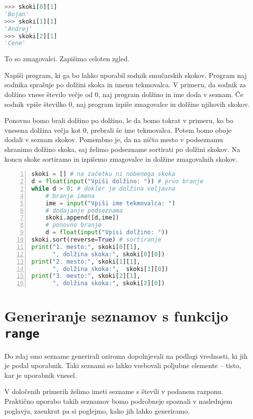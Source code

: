 \begin{lstlisting}[language=Python]
>>> skoki[0][1]
'Bojan'
>>> skoki[1][1]
'Andrej'
>>> skoki[2][1]
'Cene'
\end{lstlisting}
To so zmagovalci. Zapišimo celoten zgled.
\begin{zgled}
Napiši program, ki ga bo lahko uporabil sodnik smučarskih skokov. Program naj sodnika sprašuje po dolžini skoka in imenu tekmovalca. V primeru, da sodnik za dolžino vnese število večje od 0, naj program dolžino in ime doda v seznam. Če sodnik vpiše številko 0, naj program izpiše zmagovalce in dolžine njihovih skokov.
\end{zgled}
\begin{resitev}
Ponovno bomo brali dolžino po dolžino, le da bomo tokrat v primeru, ko bo vnesena dolžina večja kot 0, prebrali še ime tekmovalca. Potem bomo oboje dodali v seznam skokov. Pomembno je, da na ničto mesto v podseznamu shranimo dolžino skoka, saj želimo podsezname sortirati po dolžini skokov. Na koncu skoke sortiramo in izpišemo zmagovalce in dolžine zmagovalnih skokov.
\begin{lstlisting}[language=Python,numbers=left]
skoki = [] # na začetku ni nobenega skoka
d = float(input("Vpiši dolžino: ")) # prvo branje
while d > 0: # dokler je dolžina veljavna
    # branje imena
    ime = input("Vpiši ime tekmovalca: ") 
    # dodajanje podseznama
    skoki.append([d,ime]) 
    # ponovno branje
    d = float(input("Vpisi dolžino: ")) 
skoki.sort(reverse=True) # sortiranje
print("1. mesto:", skoki[0][1], 
      ", dolžina skoka:", skoki[0][0])
print("2. mesto:", skoki[1][1], 
      ", dolžina skoka:",  skoki[1][0])
print("3. mesto:", skoki[2][1], 
      ", dolžina skoka:", skoki[2][0])
\end{lstlisting}
\end{resitev}

\section{Generiranje seznamov s funkcijo \texttt{range}}

Do zdaj smo sezname generirali oziroma dopolnjevali na podlagi vrednosti, ki jih je podal uporabnik. Taki seznami so lahko vsebovali poljubne elemente -- tisto, kar je uporabnik vnesel.

V določenih primerih želimo imeti sezname s števili v podanem razponu. Praktično uporabo takih seznamov bomo podrobneje spoznali v naslednjem poglavju, zaenkrat pa si poglejmo, kako jih lahko generiramo.

